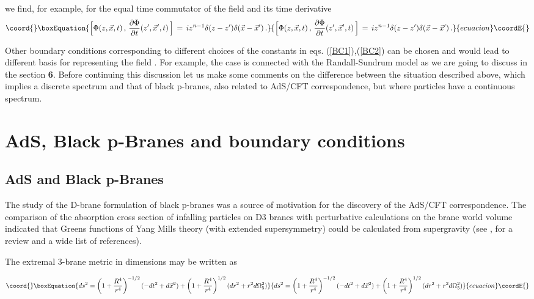 \documentclass[a4paper,12pt]{article}
\begin{document}
\noindent we find, for example, for the equal time commutator of the field 
and its time derivative
\begin{equation}\coord{}\boxEquation{
\Big[ \Phi (z,\vec x ,t)\,,\,{\partial\Phi\over \partial t}(z^\prime,
\vec x^\prime ,t)\,\Big]\,=\,i z^{n-1} \delta (z - z^\prime) 
\delta (\vec x - {\vec x}^\prime )\,.
}{
\Big[ \Phi (z,\vec x ,t)\,,\,{\partial\Phi\over \partial t}(z^\prime,
\vec x^\prime ,t)\,\Big]\,=\,i z^{n-1} \delta (z - z^\prime) 
\delta (\vec x - {\vec x}^\prime )\,.
}{ecuacion}\coordE{}\end{equation}

Other boundary conditions corresponding to different choices of 
the constants in eqs. (\ref{BC1}),(\ref{BC2}) can be chosen and 
would  lead to different  basis for representing the field \myHighlight{$\Phi$}\coordHE{}. 
For  example, the case \coordHE{}  is connected with the 
Randall-Sundrum model as we are going to discuss in the section 
{\bf 6}. Before continuing this discussion let us make some comments
on the difference between the situation described above, which implies
a discrete spectrum and that of black p-branes, also related to
AdS/CFT correspondence, but where particles have a continuous spectrum.

 
\section{AdS, Black p-Branes and boundary conditions}

\subsection{AdS and Black p-Branes }

The study of the D-brane formulation of black p-branes was a source
of motivation for the discovery of the AdS/CFT correspondence.
The comparison of the absorption cross section of infalling particles
on D3 branes with perturbative calculations on the brane world 
volume\cite{Kle1}  indicated that  Greens functions of 
Yang Mills theory (with extended supersymmetry) could be calculated 
from  supergravity (see  \cite{Malda2},\cite{Kle2} for a review 
and a wide list of references).

The extremal 3-brane metric in \coordHE{} dimensions\cite{HoSt91} may be 
written as

\begin{equation}\coord{}\boxEquation{
ds^2=\left(1+\frac{R^4}{r^4}\right)^{-1/2}(-dt^2+d\vec{x}^2)
+\left(1+\frac{R^4}{r^4}\right)^{1/2}(dr^2 +r^2d\Omega_5^2)
}{
ds^2=\left(1+\frac{R^4}{r^4}\right)^{-1/2}(-dt^2+d\vec{x}^2)
+\left(1+\frac{R^4}{r^4}\right)^{1/2}(dr^2 +r^2d\Omega_5^2)
}{ecuacion}\coordE{}\end{equation}
\end{document}

